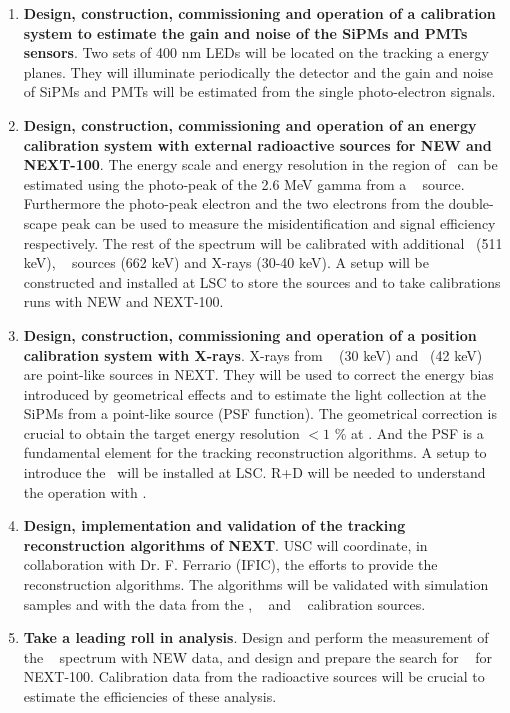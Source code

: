 \begin{enumerate}
\item {\bf Design, construction, commissioning and operation of a calibration system to estimate the gain and noise of the SiPMs and PMTs sensors}. 
Two sets of 400 nm LEDs will be located on the tracking a energy planes. They will illuminate periodically the detector and the gain and noise of SiPMs and PMTs will be estimated from the single photo-electron signals. 

\item {\bf Design, construction, commissioning and operation of an energy calibration system with external radioactive sources for NEW and NEXT-100}.
The energy scale and energy resolution in the region of \Qbb ~can be estimated using the photo-peak of the 2.6 MeV gamma from a \Tl~  source. Furthermore the photo-peak electron and the two electrons from the double-scape peak can be used to measure the misidentification and signal efficiency respectively. 
The rest of the spectrum will be calibrated with additional  \NA ~(511 keV),  \CS~ sources (662 keV) and X-rays (30-40 keV).
A setup will be constructed and installed at LSC to store the sources and to take calibrations runs with NEW and NEXT-100.

\item {\bf Design, construction, commissioning and operation of a position calibration system with X-rays}. X-rays from \Xe~ (30 keV) and \KR ~(42 keV) are point-like sources in NEXT. They will be used to correct the energy bias introduced by geometrical effects and to estimate the light collection at the SiPMs from a point-like source (PSF function). The geometrical correction is crucial to obtain the target energy resolution $<1$ \% at \Qbb. And the PSF is a fundamental element for the tracking reconstruction algorithms. A setup to introduce the \KR ~will be installed at LSC.
R+D will be needed to understand the operation with \KR.

\item {\bf Design, implementation and validation of the tracking reconstruction algorithms of NEXT}. USC will coordinate, in collaboration with Dr. F. Ferrario (IFIC), the efforts to provide the reconstruction algorithms. The algorithms will be validated with simulation samples and with the data from the \NA, \CS~  and \Tl~  calibration sources.

\item {\bf Take a leading roll in analysis}. Design and perform the measurement of the \bb~ spectrum with NEW data, and design and prepare the search for \bbonu~  for NEXT-100.  Calibration data from the radioactive sources will be crucial to estimate the efficiencies of these analysis.


\end{enumerate}
